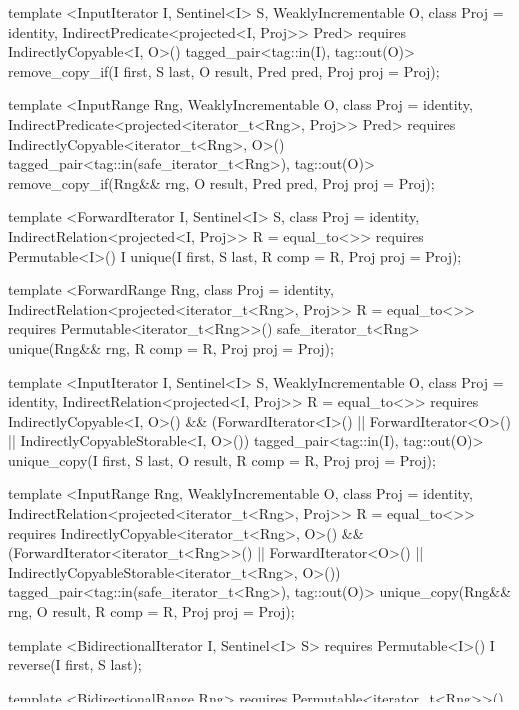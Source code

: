 \begin{codeblock}
{{{{  template <InputIterator I, Sentinel<I> S, WeaklyIncrementable O,
      class Proj = identity, IndirectPredicate<projected<I, Proj>> Pred>
    requires IndirectlyCopyable<I, O>()
    tagged_pair<tag::in(I), tag::out(O)>
      remove_copy_if(I first, S last, O result, Pred pred, Proj proj = Proj{});

  template <InputRange Rng, WeaklyIncrementable O, class Proj = identity,
      IndirectPredicate<projected<iterator_t<Rng>, Proj>> Pred>
    requires IndirectlyCopyable<iterator_t<Rng>, O>()
    tagged_pair<tag::in(safe_iterator_t<Rng>), tag::out(O)>
      remove_copy_if(Rng&& rng, O result, Pred pred, Proj proj = Proj{});

  template <ForwardIterator I, Sentinel<I> S, class Proj = identity,
      IndirectRelation<projected<I, Proj>> R = equal_to<>>
    requires Permutable<I>()
    I unique(I first, S last, R comp = R{}, Proj proj = Proj{});

  template <ForwardRange Rng, class Proj = identity,
      IndirectRelation<projected<iterator_t<Rng>, Proj>> R = equal_to<>>
    requires Permutable<iterator_t<Rng>>()
    safe_iterator_t<Rng>
      unique(Rng&& rng, R comp = R{}, Proj proj = Proj{});

  template <InputIterator I, Sentinel<I> S, WeaklyIncrementable O,
      class Proj = identity, IndirectRelation<projected<I, Proj>> R = equal_to<>>
    requires IndirectlyCopyable<I, O>() && (ForwardIterator<I>() ||
      ForwardIterator<O>() || IndirectlyCopyableStorable<I, O>())
    tagged_pair<tag::in(I), tag::out(O)>
      unique_copy(I first, S last, O result, R comp = R{}, Proj proj = Proj{});

  template <InputRange Rng, WeaklyIncrementable O, class Proj = identity,
      IndirectRelation<projected<iterator_t<Rng>, Proj>> R = equal_to<>>
    requires IndirectlyCopyable<iterator_t<Rng>, O>() &&
      (ForwardIterator<iterator_t<Rng>>() || ForwardIterator<O>() ||
       IndirectlyCopyableStorable<iterator_t<Rng>, O>())
    tagged_pair<tag::in(safe_iterator_t<Rng>), tag::out(O)>
      unique_copy(Rng&& rng, O result, R comp = R{}, Proj proj = Proj{});

  template <BidirectionalIterator I, Sentinel<I> S>
    requires Permutable<I>()
    I reverse(I first, S last);

  template <BidirectionalRange Rng>
    requires Permutable<iterator_t<Rng>>()
    safe_iterator_t<Rng>
      reverse(Rng&& rng);

  template <BidirectionalIterator I, Sentinel<I> S, WeaklyIncrementable O>
    requires IndirectlyCopyable<I, O>()
    tagged_pair<tag::in(I), tag::out(O)> reverse_copy(I first, S last, O result);

}}}}
\end{codeblock}
